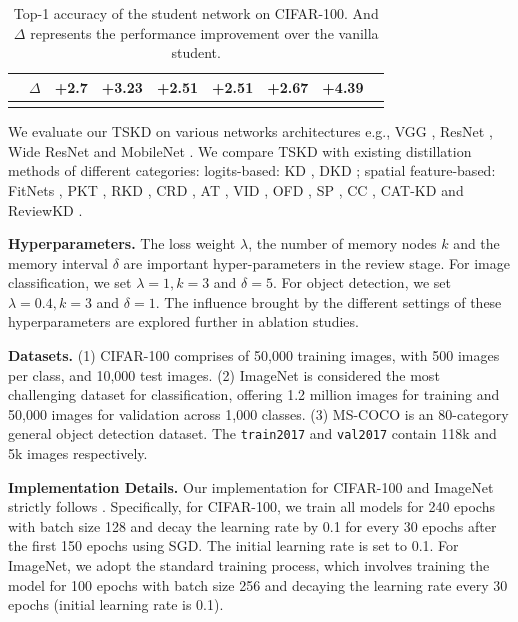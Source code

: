 \documentclass[letterpaper]{article} %
\begin{document}
\begin{table}[htbp]
\begin{tabular}{@{}ccccccccc@{}}
& $\Delta$ & \textcolor[RGB]{0, 155, 0}{+2.7} &\textcolor[RGB]{0, 155, 0}{+3.23} &\textcolor[RGB]{0, 155, 0}{+2.51} &\textcolor[RGB]{0, 155, 0}{+2.51} &\textcolor[RGB]{0, 155, 0}{+2.67} &\textcolor[RGB]{0, 155, 0}{+4.39}\\
\bottomrule
\hspace*{\fill} \\
\end{tabular}
\caption{Top-1 accuracy of the student network on CIFAR-100. And $\Delta$ represents the performance improvement over the vanilla student.}
\label{cifar100samestyle}
\end{table}

We evaluate our TSKD on various networks architectures e.g., VGG \cite{simonyan2014very}, ResNet \cite{he2016deep}, Wide ResNet \cite{zagoruyko2016wide} and MobileNet \cite{sandler2018mobilenetv2}. We compare TSKD with existing distillation methods of different categories: logits-based: KD \cite{hinton2015distilling}, DKD \cite{zhao2022decoupled}; spatial feature-based: FitNets \cite{romero2014fitnets}, PKT \cite{passalis2018probabilistic}, RKD \cite{park2019relational}, CRD \cite{tian2019contrastive}, AT \cite{zagoruyko2016paying}, VID \cite{ahn2019variational}, OFD \cite{heo2019comprehensive}, SP \cite{tung2019similarity}, CC \cite{peng2019correlation}, CAT-KD \cite{guo2023class} and ReviewKD \cite{chen2021distilling}.

\noindent\textbf{Hyperparameters.} The loss weight $\lambda$, the number of memory nodes $k$ and the memory interval $\delta$ are important hyper-parameters in the review stage. For image classification, we set $\lambda = 1,k=3$ and $\delta=5$. For object detection, we set $\lambda = 0.4, k=3$ and $\delta = 1$. The influence brought by the different settings of these hyperparameters are explored further in ablation studies.


\noindent\textbf{Datasets.} (1) CIFAR-100 \cite{krizhevsky2009learning} comprises of 50,000 training images, with 500 images per class, and 10,000 test images. (2) ImageNet \cite{deng2009imagenet} is considered the most challenging dataset for classification, offering 1.2 million images for training and 50,000 images for validation across 1,000 classes. (3) MS-COCO \cite{lin2014microsoft} is an 80-category general object detection dataset. The \texttt{train2017} and \texttt{val2017} contain 118k and 5k images respectively.

\noindent\textbf{Implementation Details.} Our implementation for CIFAR-100 and ImageNet strictly follows \cite{chen2021distilling, zhao2022decoupled}. Specifically, for CIFAR-100, we train all models for 240 epochs with batch size 128 and decay the learning rate by 0.1 for every 30 epochs after the first 150 epochs using SGD. The initial learning rate is set to 0.1. For ImageNet, we adopt the standard training process, which involves training the model for 100 epochs with batch size 256 and decaying the learning rate every 30 epochs (initial learning rate is 0.1).
\end{document}
